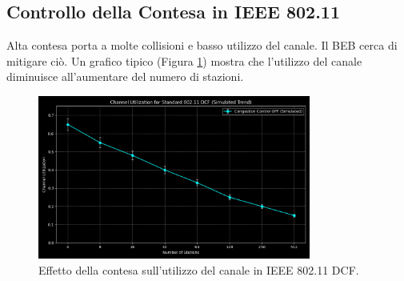 \documentclass{article}
\begin{document}
\subsection{Controllo della Contesa in IEEE 802.11}
Alta contesa porta a molte collisioni e basso utilizzo del canale. Il BEB cerca di mitigare ciò.
Un grafico tipico (Figura \ref{fig:contention_control}) mostra che l'utilizzo del canale diminuisce all'aumentare del numero di stazioni.

\begin{figure}[H]
\centering
\includegraphics[width=0.8\textwidth]{images/contention_control.png}
\caption{Effetto della contesa sull'utilizzo del canale in IEEE 802.11 DCF.}
\label{fig:contention_control}
\end{figure}
\end{document}

